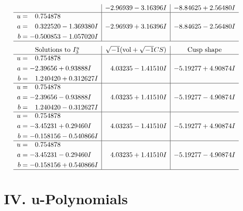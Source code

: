 \documentclass[1p]{elsarticle_modified}
\theoremstyle{definition}
\newcommand{\I}{\sqrt{-1}}
\begin{document}
$$\begin{array}{c|c|c}
 & -2.96939 - 3.16396 I & -8.84625 + 2.56480 I \\ \hline\begin{aligned}
u &= \phantom{-}0.754878\phantom{ +0.000000I} \\
a &= \phantom{-}0.322520 - 1.369380 I \\
b &= -0.500853 - 1.057020 I\end{aligned}
 & -2.96939 + 3.16396 I & -8.84625 - 2.56480 I\\
 \hline 
 \end{array}$$\newpage$$\begin{array}{c|c|c}  
\text{Solutions to }I^u_{3}& \I (\text{vol} + \sqrt{-1}CS) & \text{Cusp shape}\\
 \hline 
\begin{aligned}
u &= \phantom{-}0.754878\phantom{ +0.000000I} \\
a &= -2.39656 + 0.93888 I \\
b &= \phantom{-}1.240420 + 0.312627 I\end{aligned}
 & \phantom{-}4.03235 - 1.41510 I & -5.19277 + 4.90874 I \\ \hline\begin{aligned}
u &= \phantom{-}0.754878\phantom{ +0.000000I} \\
a &= -2.39656 - 0.93888 I \\
b &= \phantom{-}1.240420 - 0.312627 I\end{aligned}
 & \phantom{-}4.03235 + 1.41510 I & -5.19277 - 4.90874 I \\ \hline\begin{aligned}
u &= \phantom{-}0.754878\phantom{ +0.000000I} \\
a &= -3.45231 + 0.29460 I \\
b &= -0.158156 - 0.540866 I\end{aligned}
 & \phantom{-}4.03235 - 1.41510 I & -5.19277 + 4.90874 I \\ \hline\begin{aligned}
u &= \phantom{-}0.754878\phantom{ +0.000000I} \\
a &= -3.45231 - 0.29460 I \\
b &= -0.158156 + 0.540866 I\end{aligned}
 & \phantom{-}4.03235 + 1.41510 I & -5.19277 - 4.90874 I\\
 \hline 
 \end{array}$$\newpage
\newpage\renewcommand{\arraystretch}{1}
\centering \section*{ IV. u-Polynomials}
\end{document}
